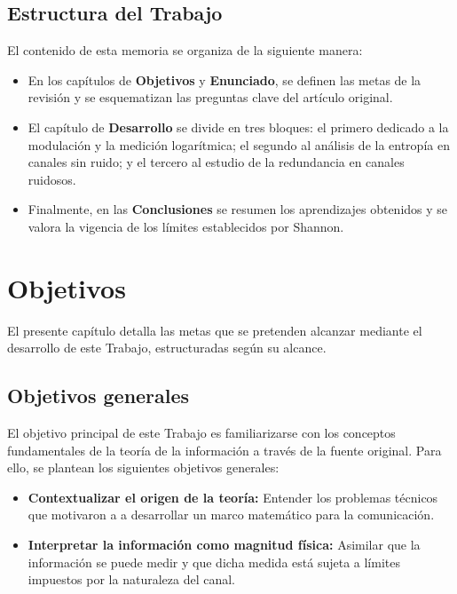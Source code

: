 \documentclass[11pt,a4paper,spanish]{book}
\begin{document}
\section{Estructura del Trabajo}

El contenido de esta memoria se organiza de la siguiente manera:

\begin{itemize}
    \item En los capítulos de \textbf{Objetivos} y \textbf{Enunciado}, se definen las metas de la revisión y se esquematizan las preguntas clave del artículo original.
    \item El capítulo de \textbf{Desarrollo} se divide en tres bloques: el primero dedicado a la modulación y la medición logarítmica; el segundo al análisis de la entropía en canales sin ruido; y el tercero al estudio de la redundancia en canales ruidosos.
    \item Finalmente, en las \textbf{Conclusiones} se resumen los aprendizajes obtenidos y se valora la vigencia de los límites establecidos por Shannon.
\end{itemize}

\chapter{Objetivos}

El presente capítulo detalla las metas que se pretenden alcanzar mediante el desarrollo de este Trabajo, estructuradas según su alcance.

\section{Objetivos generales}

El objetivo principal de este Trabajo es familiarizarse con los conceptos fundamentales de la teoría de la información a través de la fuente original. Para ello, se plantean los siguientes objetivos generales:

\begin{itemize}
    \item \textbf{Contextualizar el origen de la teoría:} Entender los problemas técnicos que motivaron a \citet{shannon1948} a desarrollar un marco matemático para la comunicación.
    \item \textbf{Interpretar la información como magnitud física:} Asimilar que la información se puede medir y que dicha medida está sujeta a límites impuestos por la naturaleza del canal.
\end{itemize}
\end{document}
